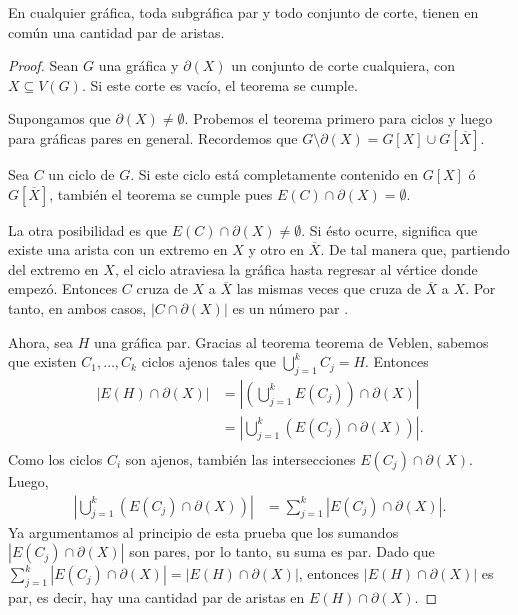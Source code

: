 \begin{teo} \label{teo:interseccionpar}
En cualquier gráfica, toda subgráfica par y todo conjunto de corte, tienen en común una cantidad par de aristas.
\end{teo}

\begin{proof} Sean $G$ una gráfica y $\partial(X)$ un conjunto de corte cualquiera, con $X \subseteq V(G)$. Si este corte es vacío, el teorema se cumple. 

Supongamos que $\partial(X) \neq \emptyset$. Probemos el teorema primero para ciclos y luego para gráficas pares en general. Recordemos que $G\setminus \partial(X) = G[X] \cup G[\overline{X}]$.

Sea $C$ un ciclo de $G$. Si este ciclo está completamente contenido en $G[X]$ ó $G[\overline{X}]$, también el teorema se cumple pues $E(C) \cap \partial(X) = \emptyset$.

La otra posibilidad es que $E(C) \cap \partial(X) \neq \emptyset$. Si ésto ocurre, significa que existe una arista con un extremo en $X$ y otro en $\overline{X}$. De tal manera que, partiendo del extremo en $X$, el ciclo atraviesa la gráfica hasta regresar al vértice donde empezó. Entonces $C$ cruza de $X$ a $\overline{X}$ las mismas veces que cruza de $\overline{X}$ a $X$. Por tanto, en ambos casos, $|C \cap \partial(X)|$ es un número par .

Ahora, sea $H$ una gráfica par. Gracias al teorema teorema de Veblen, sabemos que existen $C_{1},\ldots, C_{k}$ ciclos ajenos tales que $\bigcup_{j=1}^{k}C_{j} = H$. Entonces  
\begin{align*}
    |E(H) \cap \partial(X)| &= |(\bigcup_{j=1}^{k}E(C_{j})) \cap \partial(X)|\\
                      &= |\bigcup_{j=1}^{k} (E(C_{j}) \cap \partial(X))|.\\
\end{align*}
Como los ciclos $C_{i}$ son ajenos, también las intersecciones $E(C_{j}) \cap \partial(X)$. Luego, 
\begin{align*}
    |\bigcup_{j=1}^{k} (E(C_{j}) \cap \partial(X))| &= \sum_{j=1}^{k} |E(C_{j}) \cap \partial(X)|.
\end{align*}
Ya argumentamos al principio de esta prueba que los sumandos $|E(C_{j}) \cap \partial(X)|$ son pares, por lo tanto, su suma es par. Dado que $
    \sum_{j=1}^{k} |E(C_{j}) \cap \partial(X)| =  |E(H) \cap \partial(X)| $, entonces $ |E(H) \cap \partial(X)|$ es par, es decir, hay una cantidad par de aristas en $E(H) \cap \partial(X)$.
    
\end{proof}

